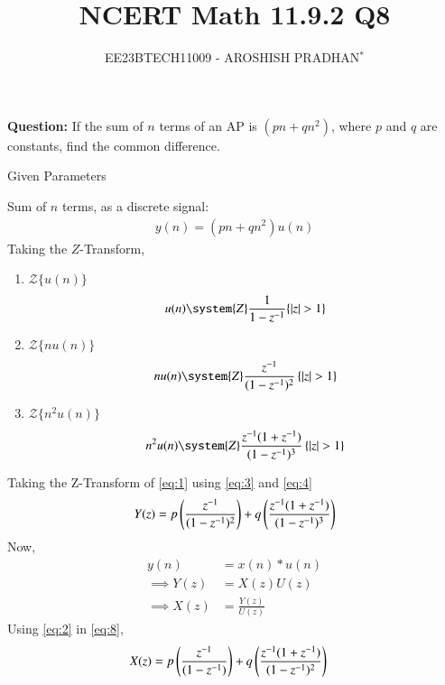 \documentclass[journal,12pt,twocolumn]{IEEEtran}
\theoremstyle{remark}
\begin{document}

\vspace{3cm}

\title{NCERT Math 11.9.2 Q8}
\author{EE23BTECH11009 - AROSHISH PRADHAN$^{*}$%
}
\maketitle
\newpage
\bigskip
\textbf{Question:} If the sum of $n$ terms of an AP is $(pn + qn^2)$, where $p$ and $q$ are constants, find the common difference.

\solution
\begin{table}[!h]
    \centering
    
    \caption{Given Parameters}
    \label{tab:1}
\end{table}

Sum of $n$ terms, as a discrete signal:
\begin{align}
    y(n) = (pn + qn^2)u(n) \label{eq:1}
\end{align}
Taking the $Z$-Transform,
\begin{enumerate}
    \item $\mathcal{Z}\{u(n)\}$
\begin{align}
    u(n) \system{Z} \frac{1}{1-z^{-1}} \{\abs{z} > 1\} \label{eq:2}
\end{align}
    \item $\mathcal{Z}\{nu(n)\}$
\begin{align}
    nu(n) \system{Z} \frac{z^{-1}}{(1-z^{-1})^2}\, \{\abs{z} > 1\} \label{eq:3}
\end{align}
\item $\mathcal{Z}{\{n^2 u(n)\}}$
    \begin{align}
        n^2u(n) \system{Z} \frac{z^{-1}(1+z^{-1})}{(1-z^{-1})^3}\, \{\abs{z} > 1\} \label{eq:4}
    \end{align}
\end{enumerate}
Taking the Z-Transform of \eqref{eq:1} using \eqref{eq:3} and \eqref{eq:4}
\begin{align}
      Y(z) = p\left(\frac{z^{-1}}{(1-z^{-1})^2}\right) + q\left(\frac{z^{-1}(1 + z^{-1})}{(1-z^{-1})^3}\right)
\end{align}
Now, 
\begin{align}
    y(n) &= x(n) \ast u(n)\\
    \implies Y(z) &= X(z)U(z)\\
    \implies X(z) &= \frac{Y(z)}{U(z)}\label{eq:8}
\end{align}
Using \eqref{eq:2} in \eqref{eq:8},
\begin{align}
    X(z) &= p\left(\frac{z^{-1}}{(1-z^{-1})}\right) + q\left(\frac{z^{-1}(1 + z^{-1})}{(1-z^{-1})^2}\right)
\end{align}
\end{document}
